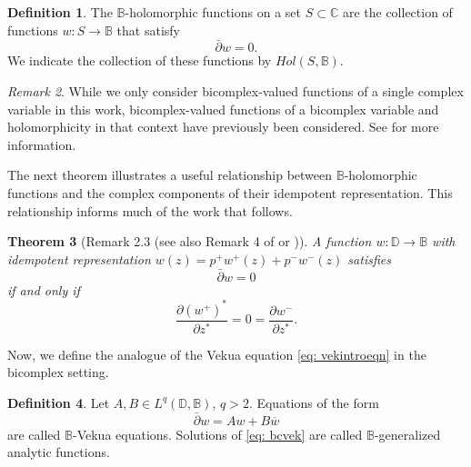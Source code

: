 \documentclass[12pt,reqno]{amsart}
\newtheorem{theorem}{Theorem}[section]
\theoremstyle{definition}
\newtheorem{deff}[theorem]{Definition}
\theoremstyle{remark}
\newtheorem{comm}[theorem]{Remark}
\newcommand{\p}{\partial}
\newcommand{\dbar}{\bar\partial}
\newcommand{\bc}{\mathbb{B}}
\newcommand{\disk}{\mathbb{D}}
\begin{document}
            \begin{deff}
            The $\bc$-holomorphic functions on a set $S \subset\mathbb{C}$ are the collection of functions $w: S \to\bc$ that satisfy
            \begin{equation}\label{eqn: bccreqn}
                \dbar w = 0.
            \end{equation}
            We indicate the collection of these functions by $Hol(S,\bc)$. 
            \end{deff}

            \begin{comm}
                While we only consider bicomplex-valued functions of a single complex variable in this work, bicomplex-valued functions of a bicomplex variable and holomorphicity in that context have previously been considered. See \cite{PriceMulti, BCHolo} for more information. 
            \end{comm}

                The next theorem illustrates a useful relationship between $\bc$-holomorphic functions and the complex components of their idempotent representation. This relationship informs much of the work that follows.  

            \begin{theorem}[Remark 2.3 \cite{BCAtomic} (see also Remark 4 of \cite{BCTransmutation} or \cite{BCBergman})]\label{thm: remark3BCAtomic}
                A function $w: \disk \to\bc$ with idempotent representation $w(z) = p^+ w^+(z) + p^- w^-(z)$ satisfies
                \[
                    \dbar w = 0
                \]
                if and only if 
                \[
                    \frac{\p (w^+)^*}{\p z^*} = 0 = \frac{\p w^-}{\p z^*}.
                \]
            \end{theorem}

            Now, we define the analogue of the Vekua equation \eqref{eq: vekintroeqn} in the bicomplex setting.

            \begin{deff}
                Let $A, B \in L^q(\disk,\bc)$, $q>2$. Equations of the form
                \begin{equation}\label{eq: bcvek}
                    \dbar w = Aw + B\overline{w}
                \end{equation}
                are called $\bc$-Vekua equations. Solutions of \eqref{eq: bcvek} are called $\bc$-generalized analytic functions. 
            \end{deff}
\end{document}
